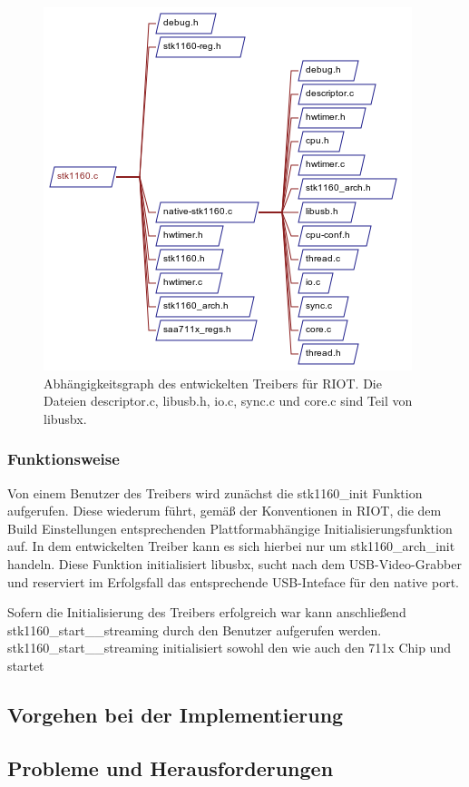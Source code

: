 \begin{figure}[htbp]
 \centering
 \includegraphics{./DependsOnGraph-stk1160-c.png}
 \caption{Abhängigkeitsgraph des entwickelten Treibers für RIOT. Die Dateien descriptor.c, libusb.h, io.c, sync.c und core.c sind Teil von libusbx.}
 \label{fig:dependsgraph}
\end{figure}

\subsubsection{Funktionsweise}
Von einem Benutzer des Treibers wird zunächst die stk1160\_init Funktion aufgerufen. Diese wiederum führt, gemäß der Konventionen in RIOT, die dem Build Einstellungen entsprechenden Plattformabhängige Initialisierungsfunktion auf. In dem entwickelten Treiber kann es sich hierbei nur um stk1160\_arch\_init handeln.
Diese Funktion initialisiert libusbx, sucht nach dem USB-Video-Grabber und reserviert im Erfolgsfall das entsprechende USB-Inteface für den native port.

Sofern die Initialisierung des Treibers erfolgreich war kann anschließend stk1160\_start\__streaming durch den Benutzer aufgerufen werden. stk1160\_start\__streaming initialisiert sowohl den  wie auch den \saa711x Chip und startet 
\subsection{Vorgehen bei der Implementierung}

\subsection{Probleme und Herausforderungen}

